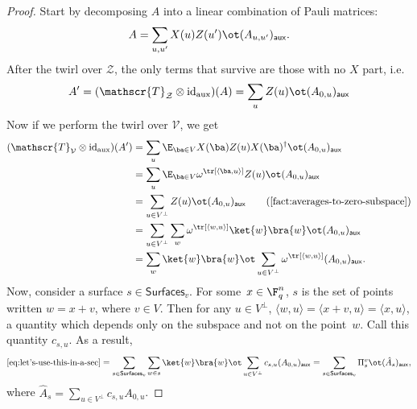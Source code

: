 \documentclass[11pt]{article}
\newcommand{\twirl}{\mathscr{T}}
\newcommand{\reg}[1]{{\mathsf{#1}}}
\newcommand{\surfaces}[1]{\mathsf{Surfaces}_{#1}}
\begin{document}
  \begin{proof}
    Start by decomposing $A$ into a linear combination of Pauli
    matrices:
    \[ A = \sum_{u,u'}  X(u) Z(u') \ot (A_{u,u'})_{\reg{aux}}. \]
    After the twirl over $\mathcal{Z}$, the only terms that survive
    are those with no $X$ part, i.e.
    \[ A' = (\twirl_{\mathcal{Z}} \otimes \mathrm{id}_{\mathrm{aux}})(A) = \sum_{u} Z(u) \ot (A_{0,u})_{\reg{aux}} \]
    Now if we perform the twirl over $\mathcal{V}$, we get
    \begin{align}
      (\twirl_{\mathcal{V}} \otimes \mathrm{id}_{\mathrm{aux}})(A')
      				&= \sum_u \E_{\ba \in V} X(\ba) Z(u) X(\ba)^\dagger \ot (A_{0,u})_{\reg{aux}}\nonumber\\
      				&= \sum_u  \E_{\ba \in V} \omega^{\tr[\langle
                                 \ba, u \rangle]} Z(u) \ot (A_{0,u})_{\reg{aux}}\nonumber \\
                               &= \sum_{u \in V^\perp}  Z(u) \ot (A_{0,u})_{\reg{aux}}\tag{\Cref{fact:averages-to-zero-subspace}}\nonumber\\
                               &= \sum_{u \in V^\perp}  \sum_{w} \omega^{\tr[\langle w, u\rangle]} \ket{w}\bra{w}  \ot (A_{0,u})_{\reg{aux}} \nonumber\\
                               &= \sum_{w}\ket{w}\bra{w}\ot \sum_{u \in V^\perp}  \omega^{\tr[\langle w, u\rangle]}    (A_{0,u})_{\reg{aux}}.\label{eq:let's-use-this-in-a-sec}
    \end{align}
    Now, consider a surface $s \in \surfaces{v}$.  For some~$x \in \F_q^n$,
    $s$ is the set of points written $w = x + v$, where $v \in V$.
    Then for any $u \in V^\perp$, $\langle w, u\rangle = \langle x + v, u \rangle = \langle x, u\rangle$,
    a quantity which depends only on the subspace and not on the point~$w$.
    Call this quantity $c_{s, u}$.
    As a result,
    \begin{equation*}
    \eqref{eq:let's-use-this-in-a-sec}
    = \sum_{s \in \surfaces{v}} \sum_{w \in s} \ket{w}\bra{w}\ot  \sum_{u \in V^\perp}c_{s, u} (A_{0,u})_{\reg{aux}}
    = \sum_{s \in \surfaces{v}} \Pi^{v}_{s} \ot (\hat{A}_s)_{\reg{aux}},
    \end{equation*}
    where $\hat{A}_s = \sum_{u \in V^\perp}c_{s, u} A_{0,u}$.
  \end{proof}
  
\end{document}
